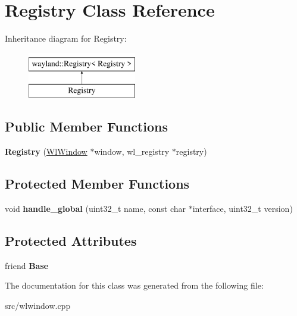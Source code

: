 \hypertarget{classRegistry}{}\section{Registry Class Reference}
\label{classRegistry}
Inheritance diagram for Registry\+:\begin{figure}[H]
\begin{center}
\leavevmode
\includegraphics[height=2.000000cm]{classRegistry}
\end{center}
\end{figure}
\subsection*{Public Member Functions}
\begin{DoxyCompactItemize}
\item 
\mbox{\label{classRegistry_afbd6733d4df6fe747e6333e2456f4452}} 
{\bfseries Registry} (\mbox{\hyperlink{classWlWindow}{Wl\+Window}} $\ast$window, wl\+\_\+registry $\ast$registry)
\end{DoxyCompactItemize}
\subsection*{Protected Member Functions}
\begin{DoxyCompactItemize}
\item 
\mbox{\label{classRegistry_aaf7023239a5c4fbb6036e8efd75bab6f}} 
void {\bfseries handle\+\_\+global} (uint32\+\_\+t name, const char $\ast$interface, uint32\+\_\+t version)
\end{DoxyCompactItemize}
\subsection*{Protected Attributes}
\begin{DoxyCompactItemize}
\item 
\mbox{\label{classRegistry_acd38a7e58930ae0fff54ec08dfa38d58}} 
friend {\bfseries Base}
\end{DoxyCompactItemize}


The documentation for this class was generated from the following file\+:\begin{DoxyCompactItemize}
\item 
src/wlwindow.\+cpp\end{DoxyCompactItemize}
